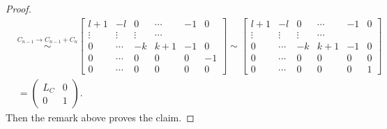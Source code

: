 \documentclass[11pt,reqno]{amsart}
\theoremstyle{definition}
\theoremstyle{plain}
\begin{document}
\begin{proof}
\begin{align}
			&\stackrel{C_{n-1} \to C_{n-1} + C_{n}}\sim
			\begin{bmatrix} 
				l + 1 & -l & 0 & \cdots & -1 & 0 \\
				\vdots & \vdots & \vdots & \cdots \\
				0 & \cdots & -k & k+1 & -1 &0 \\
				0 & \cdots & 0 & 0 & 0 & -1 \\
				0 & \cdots & 0 & 0 & 0 & 0 
			\end{bmatrix}
			\sim
			\begin{bmatrix} 
				l + 1 & -l & 0 & \cdots & -1 & 0 \\
				\vdots & \vdots & \vdots & \cdots \\
				0 & \cdots & -k & k+1 & -1 &0 \\
				0 & \cdots & 0 & 0 & 0 & 0 \\
				0 & \cdots & 0 & 0 & 0 & 1 
			\end{bmatrix}\\
			&=
			\left( \begin{array}{c|c}
				L_C & 0 \\
				\hline
				0 & 1
			\end{array} \right).
			\end{align}
			Then the remark above proves the claim.


\end{proof}
\end{document}
